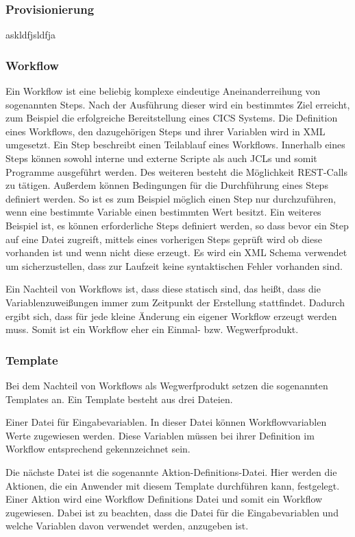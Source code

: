 \subsubsection{Provisionierung}
askldfjsldfja

\subsubsection{Workflow}\label{sssec:workflow}
Ein Workflow ist eine beliebig komplexe eindeutige Aneinanderreihung von sogenannten Steps.
Nach der Ausführung dieser wird ein bestimmtes Ziel erreicht, zum Beispiel die erfolgreiche Bereitstellung eines CICS Systems.
Die Definition eines Workflows, den dazugehörigen Steps und ihrer Variablen wird in XML umgesetzt.
Ein Step beschreibt einen Teilablauf eines Workflows.
Innerhalb eines Steps können sowohl interne und externe Scripte als auch JCLs und somit Programme ausgeführt werden.
Des weiteren besteht die Möglichkeit REST-Calls zu tätigen.
Außerdem können Bedingungen für die Durchführung eines Steps definiert werden.
So ist es zum Beispiel möglich einen Step nur durchzuführen, wenn eine bestimmte Variable einen bestimmten Wert besitzt.
Ein weiteres Beispiel ist, es können erforderliche Steps definiert werden, so dass bevor ein Step auf eine Datei zugreift, mittels eines vorherigen Steps geprüft wird ob diese vorhanden ist und wenn nicht diese erzeugt.
Es wird ein XML Schema verwendet um sicherzustellen, dass zur Laufzeit keine syntaktischen Fehler vorhanden sind.
\cite{Rotthove.2018}

Ein Nachteil von Workflows ist, dass diese statisch sind, das heißt, dass die Variablenzuweißungen immer zum Zeitpunkt der Erstellung stattfindet.
Dadurch ergibt sich, dass für jede kleine Änderung ein eigener Workflow erzeugt werden muss.
Somit ist ein Workflow eher ein Einmal- bzw. Wegwerfprodukt.

\subsubsection{Template}
Bei dem Nachteil von Workflows als Wegwerfprodukt setzen die sogenannten Templates an.
Ein Template besteht aus drei Dateien.

Einer Datei für Eingabevariablen.
In dieser Datei können Workflowvariablen Werte zugewiesen werden.
Diese Variablen müssen bei ihrer Definition im Workflow entsprechend gekennzeichnet sein.

Die nächste Datei ist die sogenannte Aktion-Definitions-Datei.
Hier werden die Aktionen, die ein Anwender mit diesem Template durchführen kann, festgelegt.
Einer Aktion wird eine Workflow Definitions Datei und somit ein Workflow zugewiesen.
Dabei ist zu beachten, dass die Datei für die Eingabevariablen und welche Variablen davon verwendet werden, anzugeben ist.

